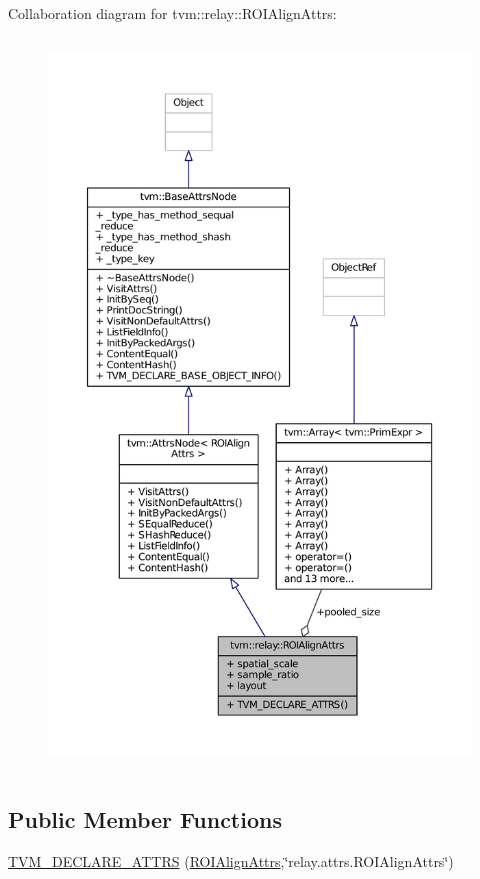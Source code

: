 Collaboration diagram for tvm\+:\+:relay\+:\+:R\+O\+I\+Align\+Attrs\+:
\nopagebreak
\begin{figure}[H]
\begin{center}
\leavevmode
\includegraphics[height=550pt]{structtvm_1_1relay_1_1ROIAlignAttrs__coll__graph}
\end{center}
\end{figure}
\subsection*{Public Member Functions}
\begin{DoxyCompactItemize}
\item 
\hyperlink{structtvm_1_1relay_1_1ROIAlignAttrs_a211206914d1eaad059fc1fef19de0489}{T\+V\+M\+\_\+\+D\+E\+C\+L\+A\+R\+E\+\_\+\+A\+T\+T\+RS} (\hyperlink{structtvm_1_1relay_1_1ROIAlignAttrs}{R\+O\+I\+Align\+Attrs},\char`\"{}relay.\+attrs.\+R\+O\+I\+Align\+Attrs\char`\"{})
\end{DoxyCompactItemize}
